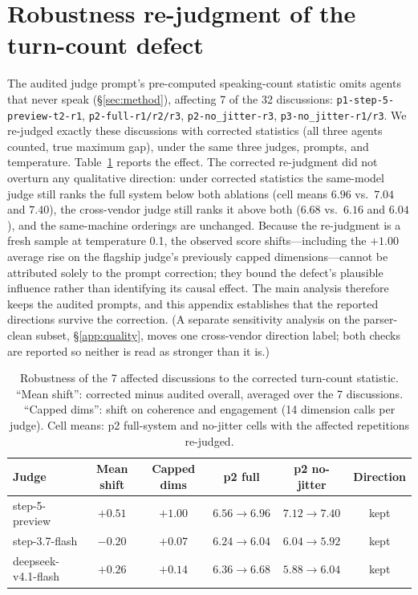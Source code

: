 \section{Robustness re-judgment of the turn-count defect}
\label{app:robust}

The audited judge prompt's pre-computed speaking-count statistic omits
agents that never speak (\S\ref{sec:method}), affecting 7 of the 32
discussions: \texttt{p1-step-5-preview-t2-r1},
\texttt{p2-full-r1/r2/r3}, \texttt{p2-no\_jitter-r3},
\texttt{p3-no\_jitter-r1/r3}. We re-judged exactly these discussions
with corrected statistics (all three agents counted, true maximum gap),
under the same three judges, prompts, and temperature.
Table~\ref{tab:robust} reports the effect. The corrected re-judgment
did not overturn any qualitative direction: under corrected statistics
the same-model judge still ranks the full system below both ablations
(cell means $6.96$ vs.\ $7.04$ and $7.40$), the cross-vendor judge
still ranks it above both ($6.68$ vs.\ $6.16$ and $6.04$), and the
same-machine orderings are unchanged. Because the re-judgment is a
fresh sample at temperature 0.1, the observed score shifts---including
the $+1.00$ average rise on the flagship judge's previously capped
dimensions---cannot be attributed solely to the prompt correction;
they bound the defect's plausible influence rather than identifying its
causal effect. The main analysis therefore keeps the audited prompts,
and this appendix establishes that the reported directions survive the
correction. (A separate sensitivity analysis on the parser-clean
subset, \S\ref{app:quality}, moves one cross-vendor direction label;
both checks are reported so neither is read as stronger than it is.)

\begin{table}[h]
\centering
\caption{Robustness of the 7 affected discussions to the corrected
turn-count statistic. ``Mean shift'': corrected minus audited overall,
averaged over the 7 discussions. ``Capped dims'': shift on coherence and
engagement (14 dimension calls per judge). Cell means: p2 full-system
and no-jitter cells with the affected repetitions re-judged.}
\label{tab:robust}
\small
\begin{tabular}{@{}lccccc@{}}
\toprule
Judge & Mean shift & Capped dims & p2 full & p2 no-jitter & Direction \\
\midrule
step-5-preview & $+0.51$ & $+1.00$ & $6.56\to6.96$ & $7.12\to7.40$ & kept \\
step-3.7-flash & $-0.20$ & $+0.07$ & $6.24\to6.04$ & $6.04\to5.92$ & kept \\
deepseek-v4.1-flash & $+0.26$ & $+0.14$ & $6.36\to6.68$ & $5.88\to6.04$ & kept \\
\bottomrule
\end{tabular}
\end{table}

